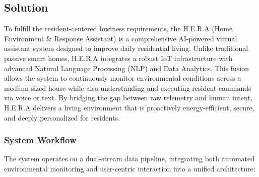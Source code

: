 \subsection{Solution}
To fulfill the resident-centered business requirements, the H.E.R.A (Home Environment \& Response Assistant) is a comprehensive AI-powered virtual assistant system designed to improve daily residential living. Unlike traditional passive smart homes, H.E.R.A integrates a robust IoT infrastructure with advanced Natural Language Processing (NLP) and Data Analytics. This fusion allows the system to continuously monitor environmental conditions across a medium-sized house while also understanding and executing resident commands via voice or text. By bridging the gap between raw telemetry and human intent, H.E.R.A delivers a living environment that is proactively energy-efficient, secure, and deeply personalized for residents.

\subsubsection*{\underline{System Workflow}}
The system operates on a dual-stream data pipeline, integrating both automated environmental monitoring and user-centric interaction into a unified architecture:

